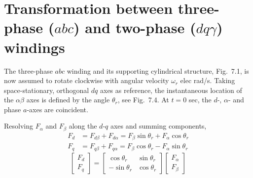 \documentclass[a4paper,numbers=noenddot,12pt]{scrbook}
\begin{document}
    \section{Transformation between three-phase ($abc$) and two-phase ($d q \gamma$) windings}

    The three-phase $abc$ winding and its supporting cylindrical structure, Fig.\ 7.1, is now assumed to rotate clockwise with angular velocity $\omega_r$ elec rad/s. Taking space-stationary, orthogonal $dq$ axes as reference, the instantaneous location of the $\alpha \beta$ axes is defined by the angle $\theta_r$, see Fig.\ 7.4. At $t = 0$ sec, the $d$-, $\alpha$- and phase $a$-axes are coincident.

    Resolving $F_{\alpha}$ and $F_{\beta}$ along the $d$-$q$ axes and summing components,
    \begin{equation}
        \begin{aligned}
            F_d & = F_{d \beta} + F_{d \alpha} = F_{\beta} \sin \theta_r + F_{\alpha} \cos \theta_r\\
            F_q & = F_{q \beta} + F_{q \alpha} = F_{\beta} \cos \theta_r - F_{\alpha} \sin \theta_r
        \end{aligned}
        \label{eq:Eq7.56}
    \end{equation}
    \begin{equation}
        \begin{bmatrix}
            F_d \\ F_q
        \end{bmatrix}
        =
        \begin{bmatrix}
            \cos \theta_r & \sin \theta_r \\
            -\sin \theta_r & \cos \theta_r
        \end{bmatrix}
        \begin{bmatrix}
            F_{\alpha} \\ F_{\beta}
        \end{bmatrix}
        \label{eq:Eq7.57}
    \end{equation}
\end{document}
